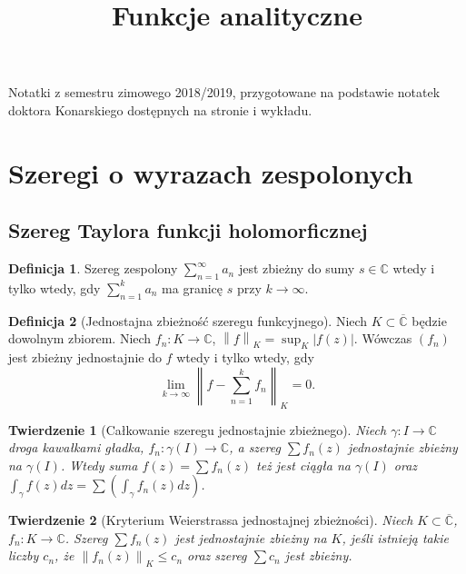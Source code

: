 \documentclass[11pt]{article}
\title{Funkcje analityczne}
\newcommand{\abs}[1]{\left|#1\right|} %
\newcommand{\norm}[1]{\left\lVert#1\right\rVert} %
\newcommand{\extcomplex}{\overline{\mathbb{C}}} %
\theoremstyle{plain}
\newtheorem*{theorem}{Twierdzenie}
\theoremstyle{definition}
\newtheorem*{definition}{Definicja}
\theoremstyle{remark}
\begin{document}
{\huge\bfseries\@title\par}
\vspace{0.2cm}
Notatki z semestru zimowego 2018/2019, przygotowane na podstawie notatek doktora Konarskiego dostępnych na stronie i wykładu.

{\small\listoftheorems[ignoreall,onlynamed={theorem,definition,remark,corollary}]}

\section{Szeregi o wyrazach zespolonych}

\subsection{Szereg Taylora funkcji holomorficznej}

\begin{definition}
  Szereg zespolony $\sum_{n=1}^{\infty} a_{n}$ jest zbieżny do sumy $ s \in \mathbb{C} $ wtedy i tylko wtedy, gdy $ \sum_{n=1}^{k} a_{n} $ ma granicę $ s $ przy $ k\to\infty $.
\end{definition}

\begin{definition}[Jednostajna zbieżność szeregu funkcyjnego]
  Niech $ K \subset \extcomplex $ będzie dowolnym zbiorem. Niech $ f_{n} \colon K \to \mathbb{C} $, $ \norm{f}_{K} = \sup_{K}\abs{f(z)} $. Wówczas $ (f_{n}) $ jest zbieżny jednostajnie do $ f $ wtedy i tylko wtedy, gdy
  $$ \lim_{k\to\infty} \norm{f - \sum_{n=1}^{k} f_{n}}_{K} = 0. $$
\end{definition}

\begin{theorem}[Całkowanie szeregu jednostajnie zbieżnego]
  Niech $ \gamma \colon I \to \mathbb{C} $ droga kawałkami gładka, $ f_{n} \colon \gamma(I) \to \mathbb{C} $, a szereg $ \sum f_{n}(z) $ jednostajnie zbieżny na $ \gamma(I) $. Wtedy suma $ f(z) = \sum f_{n}(z) $ też jest ciągła na $ \gamma(I) $ oraz $ \int_{\gamma} f(z) dz = \sum (\int_{\gamma} f_{n}(z) dz) $.
\end{theorem}

\begin{theorem}[Kryterium Weierstrassa jednostajnej zbieżności]
  Niech $ K \subset \extcomplex $, $ f_{n} \colon K \to \mathbb{C} $. Szereg $ \sum f_{n}(z) $ jest jednostajnie zbieżny na $ K $, jeśli istnieją takie liczby $ c_{n} $, że $ \norm{f_n(z)}_K \leq c_{n} $ oraz szereg $ \sum c_{n} $ jest zbieżny.
\end{theorem}
\end{document}
